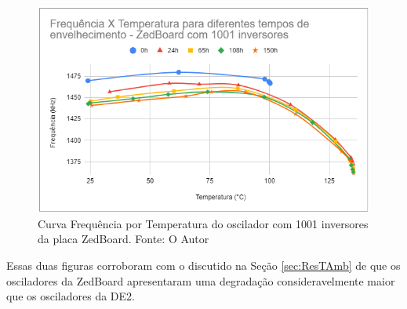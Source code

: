 \begin{figure}[H]
    \centering
    \includegraphics[scale=0.75]{figures/Resultados/FreqXTempZedBoard1001}
    \caption{Curva Frequência por Temperatura do oscilador com 1001 inversores da placa ZedBoard. Fonte: O Autor}
    \label{fig:FreqXTempZedBoard1001}
\end{figure}

Essas duas figuras corroboram com o discutido na Seção \ref{sec:ResTAmb} de que os osciladores da ZedBoard apresentaram uma degradação consideravelmente maior que os osciladores da DE2.
